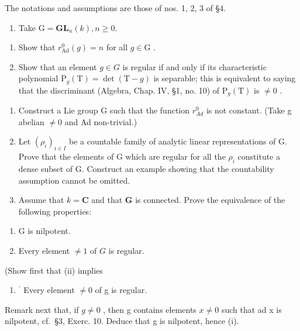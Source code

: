 
The notations and assumptions are those of nos. 1, 2, 3 of §4.

\begin{enumerate}
\def\labelenumi{\arabic{enumi})}
\tightlist
\item
  Take \(\mathrm{G} = \mathbf{GL}_{n}(k), n \geq 0.\)
\end{enumerate}

\begin{enumerate}
\def\labelenumi{\alph{enumi})}
\item
  Show that \(r_{\mathrm{Ad}}^0 (g) = n\) for all \(g \in \mathrm{G}\) .
\item
  Show that an element \(g \in G\) is regular if and only if its characteristic polynomial \(\mathrm{P}_{g}(\mathrm{T}) = \det(\mathrm{T} - g)\) is separable; this is equivalent to saying that the discriminant (Algebra, Chap. IV, §1, no. 10) of \(\mathrm{P}_{g}(\mathrm{T})\) is \(\neq 0\) .
\end{enumerate}

\begin{enumerate}
\def\labelenumi{\arabic{enumi})}
\setcounter{enumi}{1}
\item
  Construct a Lie group G such that the function \(r_{Ad}^{0}\) is not constant. (Take g abelian \(\neq 0\) and Ad non-trivial.)
\item
  Let \((\rho_{i})_{i\in I}\) be a countable family of analytic linear representations of G. Prove that the elements of G which are regular for all the \(\rho_{i}\) constitute a dense subset of G. Construct an example showing that the countability assumption cannot be omitted.
\item
  Assume that \(k = \mathbf{C}\) and that \(\mathbf{G}\) is connected. Prove the equivalence of the following properties:
\end{enumerate}

\begin{enumerate}
\def\labelenumi{(\roman{enumi})}
\item
  G is nilpotent.
\item
  Every element \(\neq 1\) of \(G\) is regular.
\end{enumerate}

(Show first that (ii) implies

\begin{enumerate}
\def\labelenumi{(\roman{enumi})}
\setcounter{enumi}{1}
\tightlist
\item
  \(^{\prime}\) Every element \(\neq 0\) of g is regular.
\end{enumerate}

Remark next that, if \(g \neq 0\) , then g contains elements \(x \neq 0\) such that ad x is nilpotent, cf.~§3, Exerc. 10. Deduce that g is nilpotent, hence (i).

